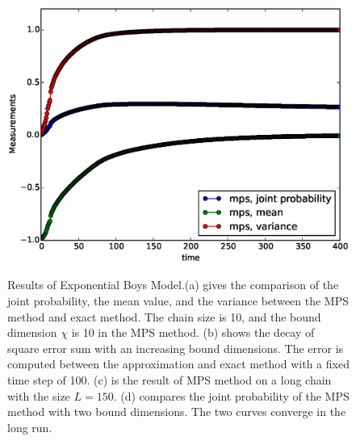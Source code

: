 \begin{figure}[htbp]
{\includegraphics[scale=0.4]{Result_Fig/Projection_MPS_t400_s200_bd10.eps}}\hfill
{}
  \caption{Results of Exponential Boys Model.(a) gives the comparison of the joint probability, the mean value, and the variance between the MPS method and exact method. The chain size is 10, and the bound dimension $\chi$ is 10 in the MPS method. (b) shows the decay of square error sum with an increasing bound dimensions. The error is computed between the approximation and exact method with a fixed time step of 100. (c) is the result of MPS method on a long chain with the size $L=150$. (d) compares the joint probability of the MPS method with two bound dimensions. The two curves converge in the long run.}
  \label{fig:Projection_result}
\end{figure}







